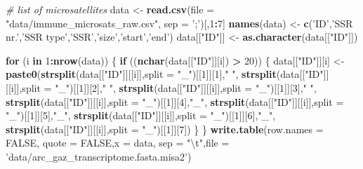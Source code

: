 \documentclass[]{article}
\newenvironment{Shaded}{\begin{snugshade}}{\end{snugshade}}
\newcommand{\KeywordTok}[1]{\textcolor[rgb]{0.13,0.29,0.53}{\textbf{#1}}}
\newcommand{\DataTypeTok}[1]{\textcolor[rgb]{0.13,0.29,0.53}{#1}}
\newcommand{\DecValTok}[1]{\textcolor[rgb]{0.00,0.00,0.81}{#1}}
\newcommand{\CharTok}[1]{\textcolor[rgb]{0.31,0.60,0.02}{#1}}
\newcommand{\StringTok}[1]{\textcolor[rgb]{0.31,0.60,0.02}{#1}}
\newcommand{\CommentTok}[1]{\textcolor[rgb]{0.56,0.35,0.01}{\textit{#1}}}
\newcommand{\OtherTok}[1]{\textcolor[rgb]{0.56,0.35,0.01}{#1}}
\newcommand{\ControlFlowTok}[1]{\textcolor[rgb]{0.13,0.29,0.53}{\textbf{#1}}}
\newcommand{\OperatorTok}[1]{\textcolor[rgb]{0.81,0.36,0.00}{\textbf{#1}}}
\newcommand{\NormalTok}[1]{#1}
\begin{document}
\begin{Shaded}
\begin{Highlighting}[]
\CommentTok{# list of microsatellites }
\NormalTok{data <-}\StringTok{ }\KeywordTok{read.csv}\NormalTok{(}\DataTypeTok{file =} \StringTok{"data/immune_microsats_raw.csv"}\NormalTok{, }\DataTypeTok{sep =} \StringTok{';'}\NormalTok{)[,}\DecValTok{1}\OperatorTok{:}\DecValTok{7}\NormalTok{] }
\KeywordTok{names}\NormalTok{(data) <-}\StringTok{ }\KeywordTok{c}\NormalTok{(}\StringTok{'ID'}\NormalTok{,}\StringTok{'SSR nr.'}\NormalTok{,}\StringTok{'SSR type'}\NormalTok{,}\StringTok{'SSR'}\NormalTok{,}\StringTok{'size'}\NormalTok{,}\StringTok{'start'}\NormalTok{,}\StringTok{'end'}\NormalTok{)}
\NormalTok{data[[}\StringTok{"ID"}\NormalTok{]] <-}\StringTok{ }\KeywordTok{as.character}\NormalTok{(data[[}\StringTok{"ID"}\NormalTok{]])}

\ControlFlowTok{for}\NormalTok{ (i }\ControlFlowTok{in} \DecValTok{1}\OperatorTok{:}\KeywordTok{nrow}\NormalTok{(data)) \{}
  \ControlFlowTok{if}\NormalTok{ ((}\KeywordTok{nchar}\NormalTok{(data[[}\StringTok{"ID"}\NormalTok{]][i]) }\OperatorTok{>}\StringTok{ }\DecValTok{20}\NormalTok{)) \{}
\NormalTok{    data[[}\StringTok{"ID"}\NormalTok{]][i] <-}\StringTok{ }
\StringTok{      }\KeywordTok{paste0}\NormalTok{(}\KeywordTok{strsplit}\NormalTok{(data[[}\StringTok{"ID"}\NormalTok{]][[i]],}\DataTypeTok{split =} \StringTok{"_"}\NormalTok{)[[}\DecValTok{1}\NormalTok{]][}\DecValTok{1}\NormalTok{],}\StringTok{" "}\NormalTok{, }
             \KeywordTok{strsplit}\NormalTok{(data[[}\StringTok{"ID"}\NormalTok{]][[i]],}\DataTypeTok{split =} \StringTok{"_"}\NormalTok{)[[}\DecValTok{1}\NormalTok{]][}\DecValTok{2}\NormalTok{],}\StringTok{" "}\NormalTok{,}
             \KeywordTok{strsplit}\NormalTok{(data[[}\StringTok{"ID"}\NormalTok{]][[i]],}\DataTypeTok{split =} \StringTok{"_"}\NormalTok{)[[}\DecValTok{1}\NormalTok{]][}\DecValTok{3}\NormalTok{],}\StringTok{" "}\NormalTok{,}
             \KeywordTok{strsplit}\NormalTok{(data[[}\StringTok{"ID"}\NormalTok{]][[i]],}\DataTypeTok{split =} \StringTok{"_"}\NormalTok{)[[}\DecValTok{1}\NormalTok{]][}\DecValTok{4}\NormalTok{],}\StringTok{"_"}\NormalTok{,}
             \KeywordTok{strsplit}\NormalTok{(data[[}\StringTok{"ID"}\NormalTok{]][[i]],}\DataTypeTok{split =} \StringTok{"_"}\NormalTok{)[[}\DecValTok{1}\NormalTok{]][}\DecValTok{5}\NormalTok{],}\StringTok{"_"}\NormalTok{,}
             \KeywordTok{strsplit}\NormalTok{(data[[}\StringTok{"ID"}\NormalTok{]][[i]],}\DataTypeTok{split =} \StringTok{"_"}\NormalTok{)[[}\DecValTok{1}\NormalTok{]][}\DecValTok{6}\NormalTok{],}\StringTok{"_"}\NormalTok{,}
             \KeywordTok{strsplit}\NormalTok{(data[[}\StringTok{"ID"}\NormalTok{]][[i]],}\DataTypeTok{split =} \StringTok{"_"}\NormalTok{)[[}\DecValTok{1}\NormalTok{]][}\DecValTok{7}\NormalTok{])}
\NormalTok{  \}}
\NormalTok{\}}
\KeywordTok{write.table}\NormalTok{(}\DataTypeTok{row.names =} \OtherTok{FALSE}\NormalTok{, }\DataTypeTok{quote =} \OtherTok{FALSE}\NormalTok{,}\DataTypeTok{x =}\NormalTok{ data,}
            \DataTypeTok{sep =} \StringTok{"}\CharTok{\textbackslash{}t}\StringTok{"}\NormalTok{,}\DataTypeTok{file =} \StringTok{'data/arc_gaz_transcriptome.fasta.misa2'}\NormalTok{)}
\end{Highlighting}
\end{Shaded}
\end{document}
